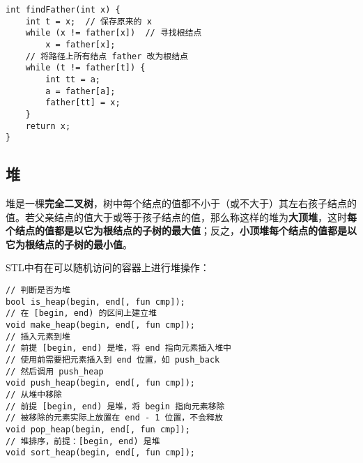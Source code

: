 \begin{lstlisting}
int findFather(int x) {
	int t = x;	// 保存原来的 x
	while (x != father[x])	// 寻找根结点
		x = father[x];
	// 将路径上所有结点 father 改为根结点
	while (t != father[t]) {
		int tt = a;
		a = father[a];
		father[tt] = x;
	}
	return x;
}
\end{lstlisting}

\subsection{堆}

堆是一棵\textbf{完全二叉树}，树中每个结点的值都不小于（或不大于）其左右孩子结点的值。若父亲结点的值大于或等于孩子结点的值，那么称这样的堆为\textbf{大顶堆}，这时\textbf{每个结点的值都是以它为根结点的子树的最大值}；反之，\textbf{小顶堆每个结点的值都是以它为根结点的子树的最小值}。

STL中有在可以随机访问的容器上进行堆操作：

\begin{lstlisting}
// 判断是否为堆
bool is_heap(begin, end[, fun cmp]);
// 在 [begin, end) 的区间上建立堆
void make_heap(begin, end[, fun cmp]);
// 插入元素到堆
// 前提 [begin, end) 是堆，将 end 指向元素插入堆中
// 使用前需要把元素插入到 end 位置，如 push_back
// 然后调用 push_heap
void push_heap(begin, end[, fun cmp]);
// 从堆中移除
// 前提 [begin, end) 是堆，将 begin 指向元素移除
// 被移除的元素实际上放置在 end - 1 位置，不会释放
void pop_heap(begin, end[, fun cmp]);
// 堆排序，前提：[begin, end) 是堆
void sort_heap(begin, end[, fun cmp]);
\end{lstlisting}






